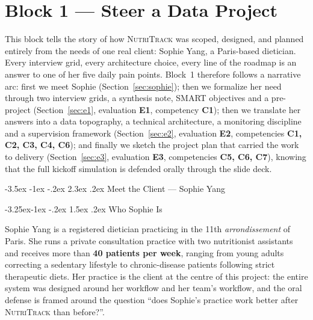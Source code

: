 \documentclass[a4paper,11pt,oneside,openany]{report}
\makeatletter
\renewcommand\section{\@startsection{section}{1}{\z@}%
  {-3.5ex \@plus -1ex \@minus -.2ex}%
  {2.3ex \@plus.2ex}%
  {\normalfont\Large\bfseries\color{ntgreen}}}
\renewcommand\subsection{\@startsection{subsection}{2}{\z@}%
  {-3.25ex\@plus -1ex \@minus -.2ex}%
  {1.5ex \@plus .2ex}%
  {\normalfont\large\bfseries\color{ntdarkgreen}}}
\newcommand{\competence}[1]{\textbf{\textcolor{ntgreen}{#1}}}
\newcommand{\evaluation}[1]{\textbf{\textcolor{ntblue}{#1}}}
\newcommand{\nutritrack}{\textsc{NutriTrack}}
\makeatother
\begin{document}
\chapter{Block 1 --- Steer a Data Project}
\label{ch:bloc1}

This block tells the story of how \nutritrack{} was scoped, designed,
and planned entirely from the needs of one real client: Sophie Yang, a
Paris-based dietician. Every interview grid, every architecture choice,
every line of the roadmap is an answer to one of her five daily pain
points. Block~1 therefore follows a narrative arc: first we meet
Sophie (Section~\ref{sec:sophie}); then we formalize her need through
two interview grids, a synthesis note, SMART objectives and a
pre-project (Section~\ref{sec:e1}, evaluation \evaluation{E1},
competency \competence{C1}); then we translate her answers into a
data topography, a technical architecture, a monitoring discipline
and a supervision framework (Section~\ref{sec:e2}, evaluation
\evaluation{E2}, competencies \competence{C1, C2, C3, C4, C6}); and
finally we sketch the project plan that carried the work to delivery
(Section~\ref{sec:e3}, evaluation \evaluation{E3}, competencies
\competence{C5, C6, C7}), knowing that the full kickoff simulation is
defended orally through the slide deck.

\section{Meet the Client --- Sophie Yang}
\label{sec:sophie}

\subsection{Who Sophie Is}

Sophie Yang is a registered dietician practicing in the 11th
\textit{arrondissement} of Paris. She runs a private consultation
practice with two nutritionist assistants and receives more than
\textbf{40 patients per week}, ranging from young adults correcting a
sedentary lifestyle to chronic-disease patients following strict
therapeutic diets. Her practice is the client at the centre of this
project: the entire system was designed around her workflow and her
team's workflow, and the oral defense is framed around the question
``does Sophie's practice work better after \nutritrack{} than
before?''.
\end{document}
